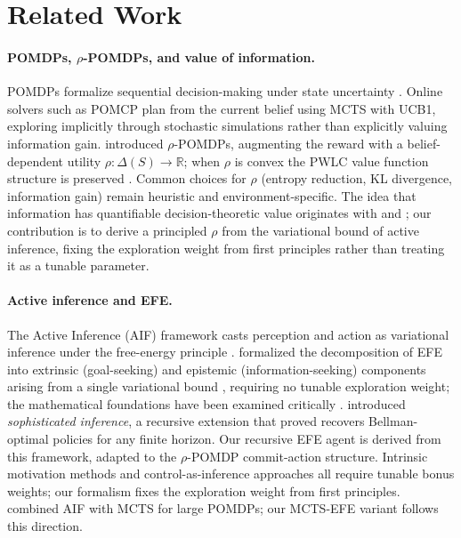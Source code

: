 \documentclass[runningheads]{llncs}
\begin{document}
\section{Related Work}

\paragraph{POMDPs, $\rho$-POMDPs, and value of information.}
POMDPs formalize sequential decision-making under state uncertainty \citep{smallwood1973, kaelbling1998}. Online solvers such as POMCP \citep{silver2010} plan from the current belief using MCTS with UCB1, exploring implicitly through stochastic simulations rather than explicitly valuing information gain. \citet{araya2010} introduced $\rho$-POMDPs, augmenting the reward with a belief-dependent utility $\rho : \Delta(S) \to \mathbb{R}$; when $\rho$ is convex the PWLC value function structure is preserved \citep{fehr2018, benchetrit2025}. Common choices for $\rho$ (entropy reduction, KL divergence, information gain) remain heuristic and environment-specific. The idea that information has quantifiable decision-theoretic value originates with \citet{howard1966} and \citet{lindley1956}; our contribution is to derive a principled $\rho$ from the variational bound of active inference, fixing the exploration weight from first principles rather than treating it as a tunable parameter.

\paragraph{Active inference and EFE.}
The Active Inference (AIF) framework \citep{friston2010} casts perception and action as variational inference under the free-energy principle \citep{parr2022}. \citet{friston2015} formalized the decomposition of EFE into extrinsic (goal-seeking) and epistemic (information-seeking) components arising from a single variational bound \citep{dacosta2020, parr2019}, requiring no tunable exploration weight; the mathematical foundations have been examined critically \citep{millidge2021, champion2024, devries2025}. \citet{friston2021} introduced \emph{sophisticated inference}, a recursive extension that \citet{dacosta2020b} proved recovers Bellman-optimal policies for any finite horizon. Our recursive EFE agent is derived from this framework, adapted to the $\rho$-POMDP commit-action structure. Intrinsic motivation methods \citep{schmidhuber1991, pathak2017, itti2009, bellemare2016, houthooft2016, burda2019} and control-as-inference approaches \citep{todorov2007, levine2018, haarnoja2018, millidge2020, sajid2021} all require tunable bonus weights; our formalism fixes the exploration weight from first principles. \citet{maisto2025} combined AIF with MCTS for large POMDPs; our MCTS-EFE variant follows this direction.
\end{document}
